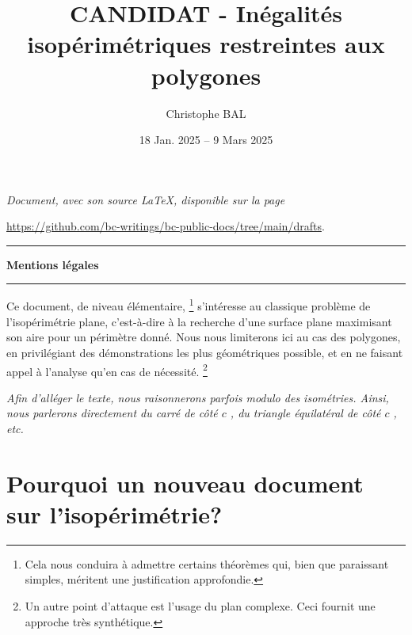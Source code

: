 \documentclass[12pt]{amsart}
\begin{document}
\title{CANDIDAT - Inégalités isopérimétriques restreintes aux polygones}
\author{Christophe BAL}
\date{18 Jan. 2025 -- 9 Mars 2025}

\maketitle

\begin{center}
	\itshape
	Document, avec son source \LaTeX, disponible sur la page

	\url{https://github.com/bc-writings/bc-public-docs/tree/main/drafts}.
\end{center}


\bigskip


\begin{center}
	\hrule\vspace{.3em}
	{
		\fontsize{1.35em}{1em}\selectfont
		\textbf{Mentions \og légales \fg}
	}

	\vspace{0.45em}
	\doclicenseThis
	\hrule
\end{center}



\setcounter{tocdepth}{2}
\tableofcontents




\newpage

Ce document, de niveau élémentaire,%
\footnote{
    Cela nous conduira à admettre certains théorèmes qui, bien que paraissant simples, méritent une justification approfondie.
}
s'intéresse au classique problème de l'isopérimétrie plane, c'est-à-dire à la recherche d'une surface plane maximisant son aire pour un périmètre donné.
Nous nous limiterons ici au cas des polygones, en privilégiant des démonstrations les plus géométriques possible, et en ne faisant appel à l'analyse qu'en cas de nécessité.%
\footnote{
    Un autre point d'attaque est l'usage du plan complexe. Ceci fournit une approche très synthétique.
}


\begin{tcolorbox}
    \itshape\small
    Afin d'alléger le texte, nous raisonnerons parfois modulo des isométries. Ainsi, nous parlerons directement du \og carré de côté \( c \) \fg, du \og triangle équilatéral de côté \( c \) \fg, etc.
\end{tcolorbox}




\section{Pourquoi un  nouveau document sur l'isopérimétrie?}

\end{document}
